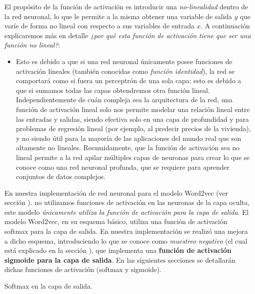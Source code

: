 \documentclass[12pt,a4paper]{article}
\makeatletter
\renewcommand\paragraph{\@startsection{paragraph}{4}{\z@}
            {-2.5ex\@plus -1ex \@minus -.25ex}
            {1.25ex \@plus .25ex}
            {\normalfont\normalsize\bfseries}}
\makeatother
\begin{document}
\begin{sloppypar}
El propósito de la función de activación es introducir una \textit{no-linealidad} dentro de la red neuronal, lo que le permite a la misma obtener una variable de salida $y$ que varíe de forma no lineal con respecto a sus variables de entrada $x$. A continuación explicaremos más en detalle \textit{¿por qué esta función de activación tiene que ser una función no lineal?}:
\begin{itemize}
\item Esto es debido a que si una red neuronal únicamente posee funciones de activación lineales (también conocidas como \textit{función identidad}), la red se comportará como si fuera un perceptrón de una sola capa: esto es debido a que si sumamos todas las capas obtendremos otra función lineal.
Independientemente de cuán compleja sea la arquitectura de la red, una función de activación lineal solo nos permite modelar una relación lineal entre las entradas y salidas, siendo efectiva solo en una capa de profundidad y para problemas de regresión lineal (por ejemplo, al predecir precios de la vivienda), y no siendo útil para la mayoría de las aplicaciones del mundo real que son altamente no lineales.
Resumidamente, que la función de activación sea no lineal permite a la red apilar múltiples capas de neuronas para crear lo que se conoce como una red neuronal profunda, que se requiere para aprender conjuntos de datos complejos.
\end{itemize}

En nuestra implementación de red neuronal para el modelo Word2vec (ver sección \textit{}). no utilizamos funciones de activación en las neuronas de la capa oculta, este modelo \textit{únicamente utiliza la función de activación para la capa de salida}. 
El modelo Word2vec, en su esquema básico, utiliza una función de activación softmax para la capa de salida. En nuestra implementación se realizó una mejora a dicho esquema, introduciendo lo que se conoce como \textit{muestreo negativo} (el cual está explicado en la sección \textit{}), que implementa una \textbf{función de activación sigmoide para la capa de salida}. En las siguientes secciones se detallarán dichas funciones de activación (softmax y sigmoide).

\paragraph{Softmax en la capa de salida.}\label{soft_capa_salida}


\end{sloppypar}
\end{document}
